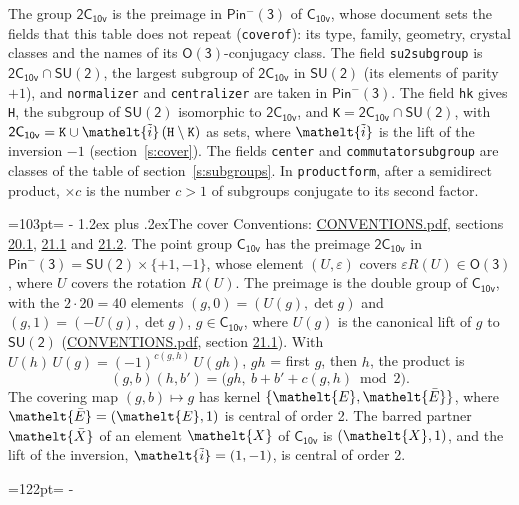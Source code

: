 \documentclass[10pt,a4paper]{article}
\makeatletter
\renewcommand\section{\@startsection{section}{1}{\z@}{-3ex plus -1ex minus -.2ex}%
  {1.2ex plus .2ex}{\normalfont\large\sffamily\bfseries\color{parttitle}}}
\newcommand{\needspace}[1]{\par\penalty-100\begingroup\dimen0=#1\relax\dimen2=\pagegoal
  \advance\dimen2-\pagetotal\ifdim\dimen0>\dimen2\relax\ifdim\dimen2>0pt\vfil\break\fi\fi
  \endgroup}
\numberwithin{equation}{section}
\newcommand{\eltfont}[1]{{\let\sigma\eltsigma\mathelt{#1}}}
\newcommand{\grp}[1]{\mathsf{#1}}
\newcommand{\elt}[1]{\eltfont{#1}}
\newcommand{\dirprod}{\times}
\newcommand{\barred}[1]{\bar{#1}}
\newcommand{\lift}[1]{\tilde{#1}}
\makeatother
\begin{document}
\leavevmode\label{n:element.inversion}\label{n:group.preimage}The group $\grp{2C_{10v}}$ is the preimage in $\grp{Pin^{-}(3)}$ of \href{../../../rotation/data/pdf/C10v.pdf}{$\grp{C_{10v}}$}, whose document sets the fields that this table does not repeat (\texttt{coverof}): its type, family, geometry, crystal classes and the names of its \href{../../../rotation/data/pdf/O3.pdf}{$\grp{O(3)}$}-conjugacy class. The field \texttt{su2subgroup} is $\grp{2C_{10v}} \cap \grp{SU(2)}$, the largest subgroup of $\grp{2C_{10v}}$ in $\grp{SU(2)}$ (its elements of parity $+1$), and \texttt{normalizer} and \texttt{centralizer} are taken in $\grp{Pin^{-}(3)}$. The field \texttt{hk} gives \texttt{H}, the subgroup of $\grp{SU(2)}$ isomorphic to $\grp{2C_{10v}}$, and \texttt{K}${} = \grp{2C_{10v}} \cap \grp{SU(2)}$, with $\grp{2C_{10v}} = \texttt{K} \cup \elt{\lift{i}}\,(\texttt{H} \setminus \texttt{K})$ as sets, where $\elt{\lift{i}}$ is the lift of the inversion $-1$ (section~\ref{s:cover}). The fields \texttt{center} and \texttt{commutatorsubgroup} are classes of the table of section~\ref{s:subgroups}.
\leavevmode\label{n:index.conjugates.c}In \texttt{productform}, after a semidirect product, ${\times}c$ is the number $c > 1$ of subgroups conjugate to its second factor.
\needspace{103pt}
\section{The cover}\label{s:cover}
Conventions: \href{../../CONVENTIONS.pdf}{CONVENTIONS.pdf}, sections \href{../../CONVENTIONS.pdf\#conv.20.1}{20.1}, \href{../../CONVENTIONS.pdf\#conv.21.1}{21.1} and \href{../../CONVENTIONS.pdf\#conv.21.2}{21.2}.
\leavevmode\label{n:group.pin.minus}\label{n:group.su2}\label{n:local.pin.sign}\label{n:matrix.covered}\label{n:matrix.lift.su2}\label{n:index.bar}The point group $\grp{C_{10v}}$ has the preimage $\grp{2C_{10v}}$ in $\grp{Pin^{-}(3)} = \grp{SU(2)} \dirprod \{+1, -1\}$, whose element $(U, \varepsilon)$ covers $\varepsilon R(U) \in \grp{O(3)}$, where $U$ covers the rotation $R(U)$. The preimage is the double group of $\grp{C_{10v}}$, with the $2 \cdot 20 = 40$ elements $(g, 0) = (U(g), \det g)$ and $(g, 1) = (-U(g), \det g)$, $g \in \grp{C_{10v}}$, where $U(g)$ is the canonical lift of $g$ to $\grp{SU(2)}$ (\href{../../CONVENTIONS.pdf}{CONVENTIONS.pdf}, section \href{../../CONVENTIONS.pdf\#conv.21.1}{21.1}). \label{n:function.cocycle}With $U(h)\,U(g) = (-1)^{c(g,h)}\,U(gh)$, $gh$ = first $g$, then $h$, the product is
\begin{equation}\label{e:product}(g, b)(h, b') = \bigl(gh,\ b + b' + c(g, h) \bmod 2\bigr).\end{equation}
\leavevmode\label{n:mark.bar}The covering map $(g, b) \mapsto g$ has kernel $\{\elt{E}, \elt{\barred{E}}\}$, where $\elt{\barred{E}} = (\elt{E}, 1)$ is central of order 2. \label{n:element.named}\label{n:mark.lift}The barred partner $\elt{\barred{X}}$ of an element $\elt{X}$ of $\grp{C_{10v}}$ is $(\elt{X}, 1)$, and the lift of the inversion, $\elt{\lift{i}} = (1, -1)$, is central of order 2.
\needspace{122pt}
\end{document}
